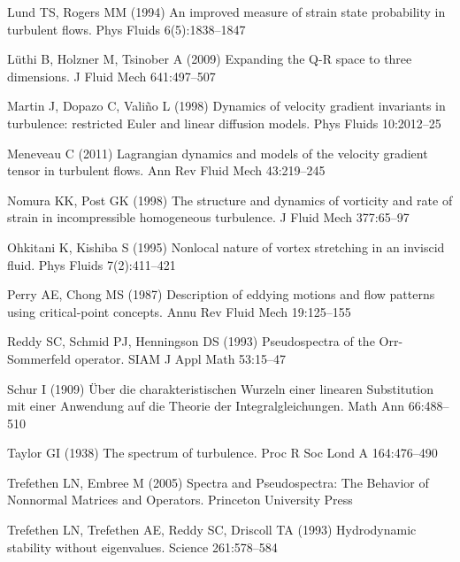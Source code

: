 \documentclass[preprint,amssymb,amsmath,aip,cha]{revtex4-1}
\begin{document}
\begin{thebibliography}{37}
{Lund} TS, {Rogers} MM (1994) An improved measure of strain state probability
  in turbulent flows. Phys Fluids 6(5):1838--1847

{L\"{u}thi} B, {Holzner} M, {Tsinober} A (2009) Expanding the {Q-R} space to
  three dimensions. J Fluid Mech 641:497--507

{Martin} J, {Dopazo} C, {Vali\~{n}o} L (1998) Dynamics of velocity gradient
  invariants in turbulence: restricted {E}uler and linear diffusion models.
  Phys Fluids 10:2012--25

{Meneveau} C (2011) {L}agrangian dynamics and models of the velocity gradient
  tensor in turbulent flows. Ann Rev Fluid Mech 43:219--245

{Nomura} KK, {Post} GK (1998) The structure and dynamics of vorticity and rate
  of strain in incompressible homogeneous turbulence. J Fluid Mech 377:65--97

{Ohkitani} K, {Kishiba} S (1995) Nonlocal nature of vortex stretching in an
  inviscid fluid. Phys Fluids 7(2):411--421

{Perry} AE, {Chong} MS (1987) Description of eddying motions and flow patterns
  using critical-point concepts. Annu Rev Fluid Mech 19:125--155

{Reddy} SC, {Schmid} PJ, {Henningson} DS (1993) Pseudospectra of the
  {O}rr-{S}ommerfeld operator. {SIAM} J Appl Math 53:15--47

{Schur} I (1909) \"{U}ber die charakteristischen {W}urzeln einer linearen
  {S}ubstitution mit einer {A}nwendung auf die {T}heorie der
  {I}ntegralgleichungen. Math Ann 66:488--510

{Taylor} GI (1938) The spectrum of turbulence. Proc R Soc Lond A 164:476--490

{Trefethen} LN, {Embree} M (2005) Spectra and Pseudospectra: The Behavior of
  Nonnormal Matrices and Operators. Princeton {U}niversity {P}ress

{Trefethen} LN, {Trefethen} AE, {Reddy} SC, {Driscoll} TA (1993) Hydrodynamic
  stability without eigenvalues. Science 261:578--584


\end{thebibliography}
\end{document}
